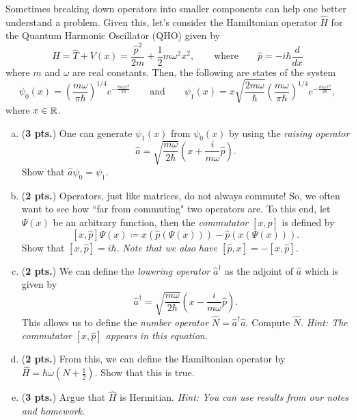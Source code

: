 \documentclass[12pt]{amsbook}
\begin{document}
\newpage
\begin{problem}
Sometimes breaking down operators into smaller components can help one better understand a problem. Given this, let's consider the Hamiltonian operator $\hat{H}$ for the Quantum Harmonic Oscillator (QHO) given by
\[
\hat{H} = \hat{T}+V(x) = \frac{\hat{p}^2}{2m} + \frac{1}{2}m\omega^2 x^2,  \qquad \textrm{where} \qquad \hat{p} = -i\hbar \frac{d}{dx}
\]
where $m$ and $\omega$ are real constants.  Then, the following are states of the system
\[
\psi_0(x) = \left(\frac{m\omega}{\pi \hbar}\right)^{1/4} e^{-\frac{m\omega x^2}{2\hbar}} \qquad \textrm{and} \qquad \psi_1(x) = x \sqrt{\frac{2m\omega}{\hbar}}\left(\frac{m\omega}{\pi \hbar}\right)^{1/4} e^{-\frac{m\omega x^2}{2\hbar}},
\]
where $x \in \mathbb{R}$. 
\begin{enumerate}[(a)]
	\item (\textbf{3 pts.}) One can generate $\psi_1(x)$ from $\psi_0(x)$ by using the \emph{raising operator}
	\[
	\hat{a} = \sqrt{\frac{m\omega }{2\hbar}}\left(x+\frac{i}{m\omega} \hat{p}\right).
	\]  
	Show that $\hat{a}\psi_0 = \psi_1$.
	
	\item (\textbf{2 pts.}) Operators, just like matrices, do not always commute! So, we often want to see how ``far from commuting" two operators are. To this end, let $\Psi(x)$ be an arbitrary function, then the \emph{commutator} $[x,\hat{p}]$ is defined by
	\[
	[x,\hat{p}] \Psi(x) \coloneqq x \left(\hat{p}\left( \Psi(x)\right)\right) - \hat{p}\left(x\left(\Psi(x)\right)\right).
	\]
	Show that $[x,\hat{p}]=i\hbar$. \textit{Note that we also have $[\hat{p},x]=-[x,\hat{p}]$.}
	
	\item (\textbf{2 pts.}) We can define the \emph{lowering operator} $\hat{a}^\dagger$ as the adjoint of $\hat{a}$ which is given by
	\[
	\hat{a}^\dagger = \sqrt{\frac{m\omega }{2\hbar}}\left(x-\frac{i}{m\omega} \hat{p} \right).
	\]
	This allows us to define the \emph{number operator} $\hat{N}=\hat{a}^\dagger \hat{a}$.  Compute $\hat{N}$. \textit{Hint: The commutator $[x,\hat{p}]$ appears in this equation.}
	
	\item (\textbf{2 pts.}) From this, we can define the Hamiltonian operator by $\hat{H}=\hbar \omega \left(N + \frac{1}{2}\right)$. Show that this is true.
	
	\item (\textbf{3 pts.}) Argue that $\hat{H}$ is Hermitian.  \textit{Hint: You can use results from our notes and homework.}
	

\end{enumerate}
\end{problem}
\end{document}
